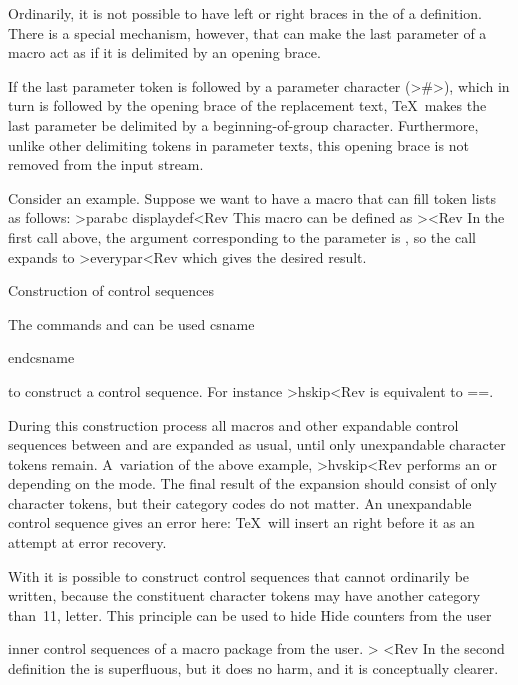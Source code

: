{Ordinarily, it is not possible to have left or right
braces in the  of a definition.
There is a special mechanism, however, that can make
the last parameter of a macro act as if it is delimited
by an opening brace. 

If the last parameter token
is followed by a parameter character (\ver>#>),
which in turn is followed by the opening brace of the
replacement text, \TeX\ makes the last parameter
be delimited by a beginning-of-group character.
Furthermore, unlike other delimiting tokens in
parameter texts, this opening brace is not
removed from the input stream.

Consider an example.
Suppose we want to have a macro
 that can fill token lists as follows:
\Ver>\every par{abc} \every display{def}<Rev
This macro can be defined as
\Ver>\def\every#1#{\csname every#1\endcsname}<Rev
In the first call above, the argument corresponding to
the parameter is , so the call 
expands to
\Ver>\csname everypar<Rev
which gives the desired result.


\point[cs:name] Construction of control sequences

The commands  and  can be used
\csterm csname\par\csterm endcsname\par
to construct a control sequence. 
For instance \Ver>\csname hskip\endcsname 5pt<Rev
is equivalent to \ver=\hskip5pt=.

During this construction process
all macros and other expandable control sequences
between  and 
are expanded as usual, until only unexpandable
character tokens remain. A~variation of the above example,
\Ver>\csname \ifhmode h\else v\fi skip\endcsname 5pt<Rev
performs an  or  depending on the mode.
The final result of the expansion should 
consist of only character tokens, but
their category codes do not matter.
An unexpandable control sequence gives an error here:
\TeX\ will insert an  right before it
as an attempt at error recovery.

With  it is possible to construct
control sequences that cannot ordinarily be written,
because the constituent character tokens may have another category
\alt
than~11, letter. This principle can be used to hide
\howto Hide counters from the user\par
inner control sequences of a macro package from the user.
\example\Ver>
\def\newcounter#1{\expandafter\newcount
    \csname #1:counter\endcsname}
\def\stepcounter#1{\expandafter\advance
    \csname #1:counter\endcsname 1\relax}<Rev
In the second definition the  is superfluous,
but it does no harm, and it is conceptually clearer.
\>

}
